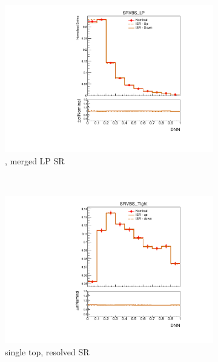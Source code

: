 \begin{figure}[htp]
\begin{subfigure}[b]{0.3\textwidth}
        \includegraphics[width=\textwidth]{figures/1lep/PDFUnc/ISR/ttbar_0ptag1pfat0pjet_0ptv_SRVBS_LP_DNN_SysTheoryISR_ttbar__1up_Norm.pdf}
        \caption{\ttbar, merged LP SR}
    \end{subfigure}
    \\
    \vspace{3mm}
    \begin{subfigure}[b]{0.3\textwidth}
        \includegraphics[width=\textwidth]{figures/1lep/PDFUnc/ISR/stop_0ptag2pjet_0ptv_SRVBS_Tight_DNN_SysTheoryISR_stop__1up_Norm.pdf}
        \caption{single top, resolved SR}
    \end{subfigure}
    \begin{subfigure}[b]{0.3\textwidth}

\end{subfigure}
\end{figure}
